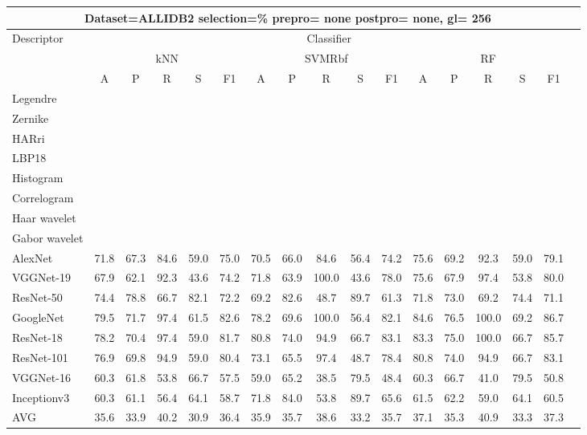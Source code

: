 \documentclass[12pt,italian]{article}
\begin{document}
\begin{tiny}
 \pagebreak 
\begin{longtable}{lcccccccccccccccc}
\toprule
\multicolumn{16}{c}{Dataset=ALLIDB2 selection=\% prepro= none postpro= none, gl= 256} \\ 
\toprule
Descriptor & \multicolumn{15}{c}{Classifier} \\ 
& \multicolumn{5}{c}{kNN} & \multicolumn{5}{c}{SVMRbf} & \multicolumn{5}{c}{RF} \\ 
& A & P & R & S & F1 & A & P & R & S & F1 & A & P & R & S & F1 \\ 
\midrule
Legendre \\ 
Zernike \\ 
HARri \\ 
LBP18 \\ 
Histogram \\ 
Correlogram \\ 
Haar wavelet \\ 
Gabor wavelet \\ 
AlexNet & 71.8 & 67.3 & 84.6 & 59.0 & 75.0 & 70.5 & 66.0 & 84.6 & 56.4 & 74.2 & 75.6 & 69.2 & 92.3 & 59.0 & 79.1 \\ 
VGGNet-19 & 67.9 & 62.1 & 92.3 & 43.6 & 74.2 & 71.8 & 63.9 & 100.0 & 43.6 & 78.0 & 75.6 & 67.9 & 97.4 & 53.8 & 80.0 \\ 
ResNet-50 & 74.4 & 78.8 & 66.7 & 82.1 & 72.2 & 69.2 & 82.6 & 48.7 & 89.7 & 61.3 & 71.8 & 73.0 & 69.2 & 74.4 & 71.1 \\ 
GoogleNet & 79.5 & 71.7 & 97.4 & 61.5 & 82.6 & 78.2 & 69.6 & 100.0 & 56.4 & 82.1 & 84.6 & 76.5 & 100.0 & 69.2 & 86.7 \\ 
ResNet-18 & 78.2 & 70.4 & 97.4 & 59.0 & 81.7 & 80.8 & 74.0 & 94.9 & 66.7 & 83.1 & 83.3 & 75.0 & 100.0 & 66.7 & 85.7 \\ 
ResNet-101 & 76.9 & 69.8 & 94.9 & 59.0 & 80.4 & 73.1 & 65.5 & 97.4 & 48.7 & 78.4 & 80.8 & 74.0 & 94.9 & 66.7 & 83.1 \\ 
VGGNet-16 & 60.3 & 61.8 & 53.8 & 66.7 & 57.5 & 59.0 & 65.2 & 38.5 & 79.5 & 48.4 & 60.3 & 66.7 & 41.0 & 79.5 & 50.8 \\ 
Inceptionv3 & 60.3 & 61.1 & 56.4 & 64.1 & 58.7 & 71.8 & 84.0 & 53.8 & 89.7 & 65.6 & 61.5 & 62.2 & 59.0 & 64.1 & 60.5 \\ 
\hline
AVG & 35.6 & 33.9 & 40.2 & 30.9 & 36.4 & 35.9 & 35.7 & 38.6 & 33.2 & 35.7 & 37.1 & 35.3 & 40.9 & 33.3 & 37.3 \\ 
\hline
\bottomrule
\end{longtable} 

 \pagebreak 
\end{tiny} 
 
\end{document}
